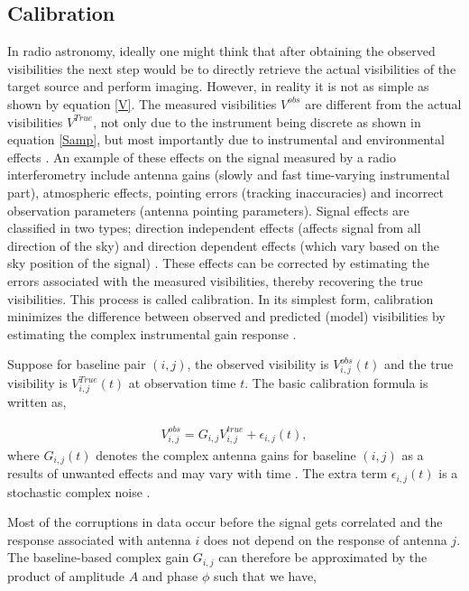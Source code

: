 \subsection{Calibration}
\label{Calib}
In radio astronomy, ideally one might think that after obtaining the observed visibilities the next step would be to directly retrieve the actual visibilities of the target source and perform imaging. However, in reality it is not as simple as shown by equation \ref{V}. The measured visibilities $V^{obs}$ are different from the actual visibilities $V^{True}$, not only due to the instrument being discrete as shown in equation \ref{Samp}, but most importantly due to instrumental and environmental effects \citep{abebe2015study}. An example of these effects on the signal measured by a radio interferometry include antenna gains (slowly and fast time-varying instrumental part), atmospheric effects, pointing errors (tracking inaccuracies) and incorrect observation parameters (antenna pointing parameters). Signal effects are classified in two types; direction independent effects (affects signal from all direction of the sky) and direction dependent effects (which vary based on the sky position of the signal) \citep{taylor1999synthesis}. These effects can be corrected by estimating the errors associated with the measured visibilities, thereby recovering the true visibilities. This process is called calibration. In its simplest form, calibration minimizes the difference between observed and predicted (model) visibilities by estimating the complex instrumental gain response \citep{grobler2016calibration}. 

Suppose for baseline pair $(i,j)$, the observed visibility is $V^{obs}_{i,j}(t)$ and the true visibility is $V^{True}_{i,j}(t)$ at observation time $t$. The basic calibration formula is written as,

\begin{align}
V_{i,j}^{obs}=G_{i,j} V_{i,j}^{true} + \epsilon_{i,j}(t) ,
\end{align}
where $G_{i,j}(t)$ denotes the complex antenna gains for baseline $(i,j)$ as a results of unwanted effects and may vary with time \citep{thompson2001interferometry}. The extra term $ \epsilon_{i,j}(t)$ is a stochastic complex noise \citep{taylor1999synthesis}.

Most of the corruptions in data occur before the signal gets correlated and the response associated with antenna  $i$  does not depend on the response of antenna $j$. The baseline-based complex gain $G_{i,j}$ can therefore be approximated by the product of amplitude $A$ and phase $\phi$ such that we have,  

